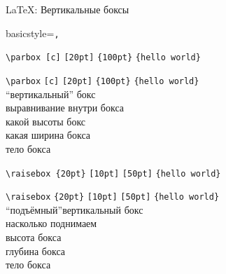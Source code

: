 \begin{frame}[fragile]{\LaTeX: Вертикальные боксы}\relax

     \lstset
    {
        basicstyle=\tt\normalsize,
    }
    \begin{tabbing}
     
        \lstinline|\parbox |\= \lstinline|[c]| \= \lstinline|[20pt]| \= \lstinline|{100pt}| \= \lstinline|{hello world}|\kill

        \lstinline|\parbox|\> \lstinline|[c]| \> \lstinline|[20pt]| \> \lstinline|{100pt}| \> \lstinline|{hello world}| \\ \footnotesize
        ``вертикальный'' бокс\>  \> \> \>  \\ 
        \>\footnotesize выравнивание внутри бокса  \> \> \> \\ 
        \>  \>\footnotesize какой высоты бокс  \> \> \\
        \>  \> \> \footnotesize какая ширина бокса  \> \\
        \>  \>  \> \> \footnotesize тело бокса \\ 
        
    \end{tabbing}
    
    \vspace*{-4ex}
    \begin{tabbing}
     
        \lstinline|\raisebox |\= \lstinline|{20pt}| \= \lstinline|[10pt]| \= \lstinline|[50pt]| \= \lstinline|{hello world}|\kill

        \lstinline|\raisebox|\> \lstinline|{20pt}| \> \lstinline|[10pt]| \> \lstinline|[50pt]| \> \lstinline|{hello world}| \\ \footnotesize
        ``подъёмный''вертикальный бокс\>  \> \> \>  \\ 
        \>\footnotesize насколько поднимаем  \> \> \> \\ 
        \>  \>\footnotesize высота бокса  \> \> \\
        \>  \> \> \footnotesize глубина бокса  \> \\
        \>  \>  \> \> \footnotesize тело бокса \\ 
        
    \end{tabbing}

     
\end{frame}

